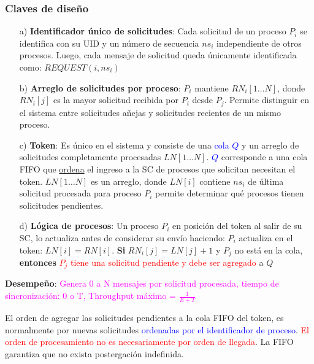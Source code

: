 \subsubsection{Claves de diseño}
\begin{itemize}
    \item[a)] \textbf{Identificador único de solicitudes}: Cada solicitud de un proceso $P_i$ se identifica con su UID y un número de secuencia $ns_i$ independiente de otros procesos. Luego, cada mensaje de solicitud queda únicamente identificada como: $REQUEST(i, ns_i)$
    \item[b)] \textbf{Arreglo de solicitudes por proceso}: $P_i$ mantiene $RN_i[1\ldots N]$, donde $RN_i[j]$ es la mayor solicitud recibida por $P_i$ desde $P_j$. Permite distinguir en el sistema entre solicitudes a\~{n}ejas y solicitudes recientes de un mismo proceso.
    \item[c)] \textbf{Token}: Es único en el sistema y consiste de una \textcolor{blue}{cola $Q$} y un arreglo de solicitudes completamente procesadas $LN[1 \ldots N]$. \textcolor{blue}{$Q$} corresponde a una cola FIFO que \underline{ordena} el ingreso a la SC de procesos que solicitan necesitan el token.  $LN[1 \ldots N]$ es un arreglo, donde $LN[i]$ contiene $ns_i$ de última solicitud procesada para proceso $P_i$  permite determinar qué procesos tienen solicitudes pendientes.
    \item[d)] \textbf{Lógica de procesos}: Un proceso $P_i$ en posición del token al salir de su SC, lo actualiza antes de considerar su envío haciendo: $P_i$ actualiza en el token: $LN[i] = RN[i]$. \textbf{Si} $RN_i[j] = LN[j] + 1$ y $P_j$ no está en la cola, \textbf{entonces} \textcolor{red}{$P_j$ tiene una solicitud pendiente y debe ser agregado }a $Q$
\end{itemize}

\textbf{Desempeño}: \textcolor{magenta}{Genera 0 a N mensajes por solicitud procesada, tiempo de sincronización: 0 o T, Throughput máximo = $\frac{1}{E+T}$}

El orden de agregar las solicitudes pendientes a la cola FIFO del token, es normalmente por nuevas solicitudes \textcolor{blue}{ordenadas por el identificador de proceso}. \textcolor{red}{El orden de procesamiento no es necesariamente por orden de llegada}. La FIFO garantiza que no exista postergación indefinida. 
